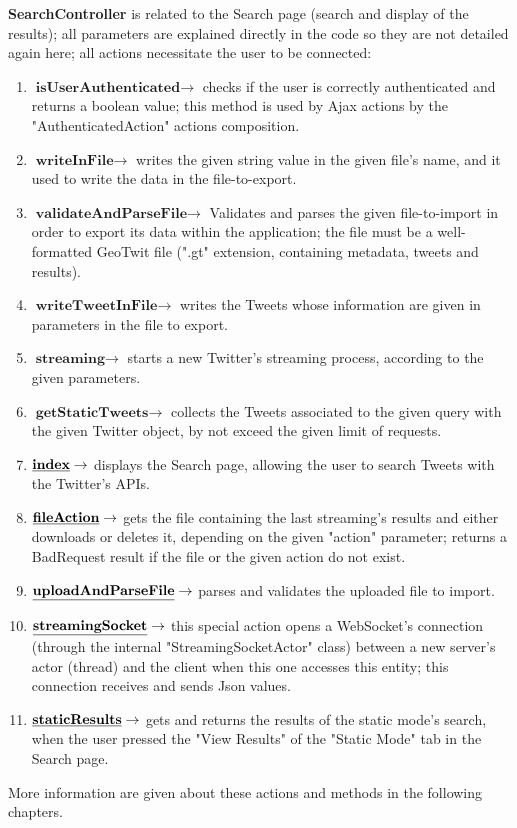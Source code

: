 \documentclass[a4paper,11pt]{report}
\begin{document}
\textbf{SearchController} is related to the Search page (search and display of the results); all parameters are explained directly in the code so they are not detailed again here; all actions necessitate the user to be connected:
\begin{enumerate}
\item $\textbf{isUserAuthenticated}\to$ checks if the user is correctly authenticated and returns a boolean value; this method is used by Ajax actions by the "AuthenticatedAction" actions composition.
\item $\textbf{writeInFile}\to$ writes the given string value in the given file's name, and it used to write the data in the file-to-export.
\item $\textbf{validateAndParseFile}\to$ Validates and parses the given file-to-import in order to export its data within the application; the file must be a well-formatted GeoTwit file (".gt" extension, containing metadata, tweets and results).    
\item $\textbf{writeTweetInFile}\to$ writes the Tweets whose information are given in parameters in the file to export.
\item $\textbf{streaming}\to$ starts a new Twitter's streaming process, according to the given parameters.
\item $\textbf{getStaticTweets}\to$ collects the Tweets associated to the given query with the given Twitter object, by not exceed the given limit of requests.
\item $\textbf{\underline{index}}\to$ displays the Search page, allowing the user to search Tweets with the Twitter's APIs.
\item $\textbf{\underline{fileAction}}\to$ gets the file containing the last streaming's results and either downloads or deletes it, depending on the given "action" parameter; returns a BadRequest result if the file or the given action do not exist.
\item $\textbf{\underline{uploadAndParseFile}}\to$ parses and validates the uploaded file to import.
\item $\textbf{\underline{streamingSocket}}\to$ this special action opens a WebSocket's connection (through the internal "StreamingSocketActor" class) between a new server's actor (thread) and the client when this one accesses this entity; this connection receives and sends Json values.
\item $\textbf{\underline{staticResults}}\to$ gets and returns the results of the static mode's search, when the user pressed the "View Results" of the "Static Mode" tab in the Search page.
\end{enumerate}
More information are given about these actions and methods in the following chapters.
\end{document}
